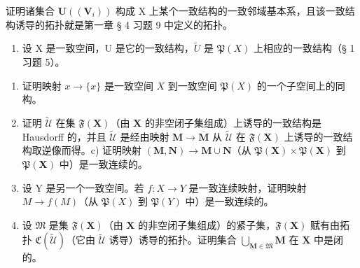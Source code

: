 证明诸集合 \(\mathbf{U}((\mathbf{V}_{i}))\) 构成 X 上某个一致结构的一致邻域基本系，且该一致结构诱导的拓扑就是第一章 § 4 习题 9 中定义的拓扑。

\begin{enumerate}
\def\labelenumi{\arabic{enumi})}
\setcounter{enumi}{5}
\tightlist
\item
  设 X 是一致空间，U 是它的一致结构，\(\tilde{U}\) 是 \(\mathfrak{P}(X)\) 上相应的一致结构（§ 1 习题 5）。
\end{enumerate}

\begin{enumerate}
\def\labelenumi{\alph{enumi})}
\item
  证明映射 \(x \to \{x\}\) 是一致空间 \(X\) 到一致空间 \(\mathfrak{P}(X)\) 的一个子空间上的同构。
\item
  证明 \(\widetilde{\mathcal{U}}\) 在集 \(\mathfrak{F}(\mathbf{X})\)（由 \(\mathbf{X}\) 的非空闭子集组成）上诱导的一致结构是 Hausdorff 的，并且 \(\widetilde{\mathcal{U}}\) 是经由映射 \(\mathbf{M} \to \overline{\mathbf{M}}\) 从 \(\widetilde{\mathcal{U}}\) 在 \(\mathfrak{F}(\mathbf{X})\) 上诱导的一致结构取逆像而得。c) 证明映射 \((\mathbf{M}, \mathbf{N}) \to \mathbf{M} \cup \mathbf{N}\)（从 \(\mathfrak{P}(\mathbf{X}) \times \mathfrak{P}(\mathbf{X})\) 到 \(\mathfrak{P}(\mathbf{X})\) 中）是一致连续的。
\item
  设 Y 是另一个一致空间。若 \(f: X \to Y\) 是一致连续映射，证明映射 \(M \to f(M)\)（从 \(\mathfrak{P}(X)\) 到 \(\mathfrak{P}(Y)\) 中）是一致连续的。
\item
  设 \(\mathfrak{M}\) 是集 \(\mathfrak{F}(\mathbf{X})\)（由 \(\mathbf{X}\) 的非空闭子集组成）的紧子集，\(\mathfrak{F}(\mathbf{X})\) 赋有由拓扑 \(\mathfrak{C}(\tilde{\mathcal{U}})\)（它由 \(\tilde{\mathcal{U}}\) 诱导）诱导的拓扑。证明集合 \(\bigcup_{\mathbf{M} \in \mathfrak{M}} \mathbf{M}\) 在 \(\mathbf{X}\) 中是闭的。
\end{enumerate}

